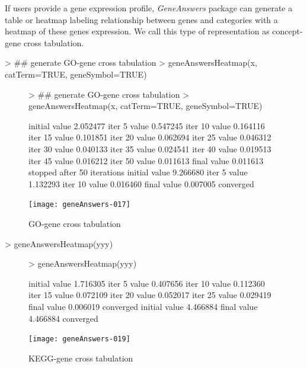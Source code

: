 \documentclass[a4paper]{article}
\newcommand{\Rpackage}[1]{{\textit{#1}}}
\begin{document}
If users provide a gene expression profile, \Rpackage{GeneAnswers} package can generate a table or heatmap labeling relationship between genes and categories with a heatmap of these genes expression. We call this type of representation as concept-gene cross tabulation.

\begin{Schunk}
\begin{Sinput}
> ## generate GO-gene cross tabulation
> geneAnswersHeatmap(x, catTerm=TRUE, geneSymbol=TRUE)
\end{Sinput}
\end{Schunk}

\begin{figure}
\centering
\begin{Schunk}
\begin{Sinput}
> ## generate GO-gene cross tabulation
> geneAnswersHeatmap(x, catTerm=TRUE, geneSymbol=TRUE)
\end{Sinput}
\begin{Soutput}
initial  value 2.052477 
iter   5 value 0.547245
iter  10 value 0.164116
iter  15 value 0.101851
iter  20 value 0.062694
iter  25 value 0.046312
iter  30 value 0.040133
iter  35 value 0.024541
iter  40 value 0.019513
iter  45 value 0.016212
iter  50 value 0.011613
final  value 0.011613 
stopped after 50 iterations
initial  value 9.266680 
iter   5 value 1.132293
iter  10 value 0.016460
final  value 0.007005 
converged
\end{Soutput}
\end{Schunk}
\texttt{[image: geneAnswers-017]}
\caption{GO-gene cross tabulation}
\label{fig:GO-gene cross tabulation}
\end{figure}    

\begin{Schunk}
\begin{Sinput}
> geneAnswersHeatmap(yyy)
\end{Sinput}
\end{Schunk}

\begin{figure}
\centering
\begin{Schunk}
\begin{Sinput}
> geneAnswersHeatmap(yyy)
\end{Sinput}
\begin{Soutput}
initial  value 1.716305 
iter   5 value 0.407656
iter  10 value 0.112360
iter  15 value 0.072109
iter  20 value 0.052017
iter  25 value 0.029419
final  value 0.006019 
converged
initial  value 4.466884 
final  value 4.466884 
converged
\end{Soutput}
\end{Schunk}
\texttt{[image: geneAnswers-019]}
\caption{KEGG-gene cross tabulation}
\label{fig:KEGG-gene cross tabulation}
\end{figure}
\end{document}
